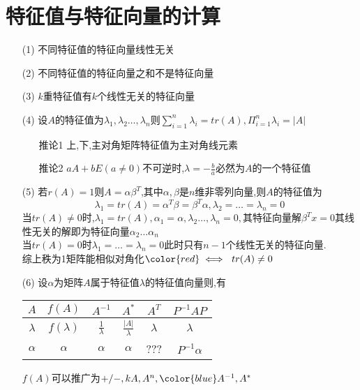 \documentclass[12pt, a4paper, oneside, UTF8]{ctexbook}
\begin{document}
\section{特征值与特征向量的计算}
\begin{definition}[特征值与特征值向量的性质]
    \begin{enumerate}
        \item [(1)] 不同特征值的特征向量线性无关 
        \item [(2)] 不同特征值的特征向量之和不是特征向量
        \item [(3)] $k\text{重特征值有}k\text{个线性无关的特征向量}$ 
        \item [(4)] 设$A$的特征值为$\lambda_1,\lambda_2\ldots,\lambda_n$则$\displaystyle \sum_{i=1}^{n}\lambda_i=tr(A),\Pi_{i=1}^{n}\lambda_i=\left|A\right|$ 
        \begin{enumerate}
            \item [推论1] 上,下,主对角矩阵特征值为主对角线元素 
            \item [推论2] $aA+bE(a\neq 0)$不可逆时,$\lambda=-\frac{b}{a}$必然为$A$的一个特征值
        \end{enumerate}
        \item [(5)] 若$r(A)=1$则$A=\alpha\beta^{T}$,其中$\alpha,\beta$是$n$维非零列向量,则$A$的特征值为 
        $$
        \lambda_1=tr(A)=\alpha^T\beta=\beta^T\alpha, \lambda_2=\ldots=\lambda_n = 0
        $$
        当$tr(A)\neq 0$时,$\lambda_1 = tr(A),\alpha_1=\alpha,\lambda_2\ldots,\lambda_n = 0,$其特征向量解$\beta^T x = 0$其线性无关的解即为特征向量$\alpha_2\ldots\alpha_n$  \\
        当$tr(A)=0$时$\lambda_1=\ldots=\lambda_n=0$此时只有$n-1$个线性无关的特征向量. \\
        综上秩为1矩阵能相似对角化$\color{red}\iff\ tr(A)\neq 0$ 
        \item [(6)] 设$\alpha$为矩阵$A$属于特征值$\lambda$的特征值向量则,有 
        \begin{center}
            \begin{tabular}{ |c|c|c|c|c|c| }
                \hline
                $A$ & $f(A)$ & $A^{-1}$ & $A^*$ & $A^T$ & $P^{-1}AP$  \\
                \hline
                $\lambda$ & $f(\lambda)$ & $\frac{1}{\lambda}$ & $\frac{\left|A\right|}{\lambda}$ & $\lambda$ & $\lambda$ \\
                \hline 
                $\alpha$ & $\alpha$ & $\alpha$ & $\alpha$ & ??? & $P^{-1}\alpha$ \\
                \hline
            \end{tabular}
        \end{center}
        $f(A)$可以推广为$+/-,kA,A^n,{\color{blue}A^{-1},A^*}$
    \end{enumerate}
\end{definition}
\end{document}
